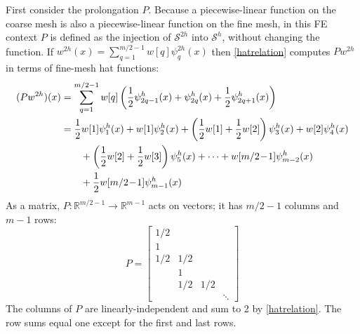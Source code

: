\documentclass[letterpaper,final,12pt,reqno]{amsart}
\newcommand{\RR}{\mathbb{R}}
\begin{document}
First consider the prolongation $P$.  Because a piecewise-linear function on the coarse mesh is also a piecewise-linear function on the fine mesh, in this FE context $P$ is defined as the injection of $\mathcal{S}^{2h}$ into $\mathcal{S}^h$, without changing the function.  If $w^{2h}(x) = \sum_{q=1}^{m/2-1} w[q] \psi_q^{2h}(x)$ then \eqref{hatrelation} computes $P w^{2h}$ in terms of fine-mesh hat functions:
\begin{align}
(P w^{2h})(x) &= \sum_{q=1}^{m/2-1} w[q] \left(\frac{1}{2} \psi_{2q-1}^h(x) + \psi_{2q}^h(x) + \frac{1}{2} \psi_{2q+1}^h(x)\right) \label{pformula} \\
              &= \frac{1}{2} w[1] \psi_1^h(x) + w[1] \psi_2^h(x) + \left(\frac{1}{2} w[1] + \frac{1}{2} w[2]\right) \psi_3^h(x) + w[2] \psi_4^h(x) \notag \\
              &\qquad + \left(\frac{1}{2} w[2] + \frac{1}{2} w[3]\right) \psi_5^h(x) + \dots + w[m/2\!-\!1] \psi_{m-2}^h(x) \notag \\
              &\qquad + \frac{1}{2} w[m/2\!-\!1] \psi_{m-1}^h(x) \notag
\end{align}
As a matrix, $P:\RR^{m/2-1} \to \RR^{m-1}$ acts on vectors; it has $m/2-1$ columns and $m-1$ rows:
\begin{equation}
P = \begin{bmatrix}
1/2 & & & \\
1 & & & \\
1/2 & 1/2 & & \\
 & 1 & & \\
 & 1/2 & 1/2 & \\
 & & & \ddots
\end{bmatrix} \label{pmatrix}
\end{equation}
The columns of $P$ are linearly-independent and sum to 2 by \eqref{hatrelation}.  The row sums equal one except for the first and last rows.
\end{document}
